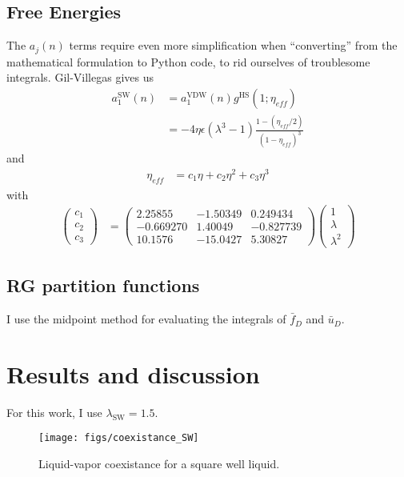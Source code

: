 \documentclass[letterpaper,twocolumn,amsmath,amssymb,prb]{revtex4-1}
\newcommand{\1}{\ensuremath{\textbf{r}_1}}
\newcommand{\2}{\ensuremath{\textbf{r}_2}}
\newcommand{\3}{\ensuremath{\textbf{r}_3}}
\newcommand{\4}{\ensuremath{\textbf{r}_4}}
\begin{document}
\subsection{Free Energies}\label{subsec:free-energies}
The $a_j(n)$ terms require even more simplification when
``converting'' from the mathematical formulation to Python code, to
rid ourselves of troublesome integrals. Gil-Villegas gives us
\newcommand\eff{\textit{eff}}
\begin{align}
  a_1^\text{SW}(n) &= a_1^\text{VDW}(n)g^\text{HS}(1;\eta_{\eff}) \\
  &= -4\eta\epsilon(\lambda^3 - 1)\frac{1 - \left( \eta_{\eff}/2 \right)}{(1 - \eta_{\eff})^3}
\end{align}
and
\begin{align}
  \eta_{\eff} &= c_1\eta + c_2\eta^2 + c_3\eta^3
\end{align}
with
\begin{align}
  \left( \begin{array}{c}
    c_1 \\
    c_2 \\
    c_3
    \end{array} \right)
  &= \left( \begin{array}{ccc}
    2.25855 & -1.50349 & 0.249434 \\
    -0.669270 & 1.40049 & -0.827739 \\
    10.1576 & -15.0427 & 5.30827
    \end{array} \right)
  \left( \begin{array}{c}
    1 \\
    \lambda \\
    \lambda^2
    \end{array} \right)
\end{align}

\subsection{RG partition functions}\label{subsec:fbar-ubar}
I use the midpoint method for evaluating the integrals of $\bar{f}_D$
and $\bar{u}_D$.

\section{Results and discussion}

For this work, I use $\lambda_\text{SW} = 1.5$.

\begin{figure}
  \begin{center}
  \texttt{[image: figs/coexistance\_SW]}
  \end{center}
  \caption{Liquid-vapor coexistance for a square well liquid.}
  \label{fig:coexistance_SW}
\end{figure}
\end{document}
